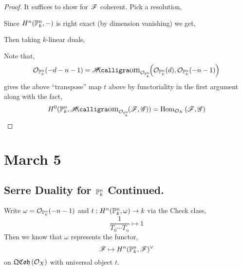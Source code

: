 \documentclass[12pt]{article}
\begin{document}
\begin{proof}
It suffices to show for $\F$ coherent. Pick a resolution, 
\begin{center}
\end{center}
Since $H^n(\P^n_k, -)$ is right exact (by dimension vanishing) we get,
\begin{center}
\end{center}
Then taking $k$-linear duals,
\begin{center}
\end{center}
Note that,
\[ \struct{\P^n_k}(-d - n- 1) = \shHom{\struct{\P^n_k}}{\struct{\P^n_k}(d)}{\struct{\P^n_k}(-n-1)} \]
gives the above ``transpose'' map $t$ above by functoriality in the first argument along with the fact,
\[ H^0(\P^n_k, \shHom{\struct{\P^n_k}}{\F}{\G}) = \Hom{\struct{X}}{\F}{\G} \]
\end{proof}

\section{March 5}

\subsection{Serre Duality for $\P^n_k$ Continued.}

Write $\omega = \struct{\P^n_k}(-n-1)$ and $t : H^n(\P^n_k, \omega) \to k$ via the Check class,
\[ \frac{1}{T_0 \cdots T_n} \mapsto 1 \]
Then we know that $\omega$ represents the functor,
\[ \F \mapsto H^n(\P^n_k, \F)^\vee \]
on $\QCoh{\struct{X}}$ with universal object $t$. 
\end{document}
